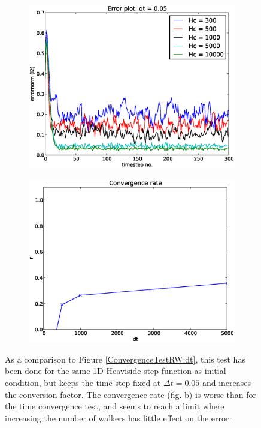 \begin{figure}[h]
 \centering
 \begin{subfigure}[t]{0.48\textwidth}
  \includegraphics[width=\textwidth]{../results/experiment_02052014_0747_Redoing_RW_tests_Hc/results/errorplot.eps}
 \end{subfigure}
\begin{subfigure}[t]{0.48\textwidth}
 \includegraphics[width=\textwidth]{../results/experiment_02052014_0747_Redoing_RW_tests_Hc/results/ConvergenceTest.eps}
\end{subfigure}
\caption[Test RW]{As a comparison to Figure \ref{ConvergenceTestRW:dt}, this test has been done for the same 1D Heaviside step function as initial condition, but keeps the time step fixed at $\Delta t = 0.05$ and increases the conversion factor. The convergence rate (fig. b) is worse than for the time convergence test, and seems to reach a limit where increasing the number of walkers has little effect on the error.}
\label{ConvergenceTestRW:Hc}
\end{figure}
\clearpage

